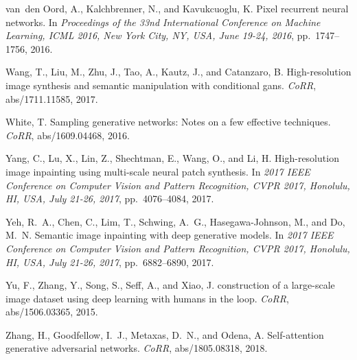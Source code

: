 \documentclass{article}
\begin{document}
\begin{multicols}{2}
{\begin{thebibliography}{36}
van~den Oord, A., Kalchbrenner, N., and Kavukcuoglu, K.
\newblock Pixel recurrent neural networks.
\newblock In \emph{Proceedings of the 33nd International Conference on Machine
  Learning, {ICML} 2016, New York City, NY, USA, June 19-24, 2016}, pp.\
  1747--1756, 2016.

Wang, T., Liu, M., Zhu, J., Tao, A., Kautz, J., and Catanzaro, B.
\newblock High-resolution image synthesis and semantic manipulation with
  conditional gans.
\newblock \emph{CoRR}, abs/1711.11585, 2017.

White, T.
\newblock Sampling generative networks: Notes on a few effective techniques.
\newblock \emph{CoRR}, abs/1609.04468, 2016.

Yang, C., Lu, X., Lin, Z., Shechtman, E., Wang, O., and Li, H.
\newblock High-resolution image inpainting using multi-scale neural patch
  synthesis.
\newblock In \emph{2017 {IEEE} Conference on Computer Vision and Pattern
  Recognition, {CVPR} 2017, Honolulu, HI, USA, July 21-26, 2017}, pp.\
  4076--4084, 2017.

Yeh, R.~A., Chen, C., Lim, T., Schwing, A.~G., Hasegawa{-}Johnson, M., and Do,
  M.~N.
\newblock Semantic image inpainting with deep generative models.
\newblock In \emph{2017 {IEEE} Conference on Computer Vision and Pattern
  Recognition, {CVPR} 2017, Honolulu, HI, USA, July 21-26, 2017}, pp.\
  6882--6890, 2017.

\bibitem[Yu et~al.(2015)Yu, Zhang, Song, Seff, and Xiao]{LSUN}
Yu, F., Zhang, Y., Song, S., Seff, A., and Xiao, J.
 construction of a large-scale image dataset using deep
  learning with humans in the loop.
\newblock \emph{CoRR}, abs/1506.03365, 2015.

Zhang, H., Goodfellow, I.~J., Metaxas, D.~N., and Odena, A.
\newblock Self-attention generative adversarial networks.
\newblock \emph{CoRR}, abs/1805.08318, 2018.

\end{thebibliography}
 }
\end{multicols}
\end{document}
